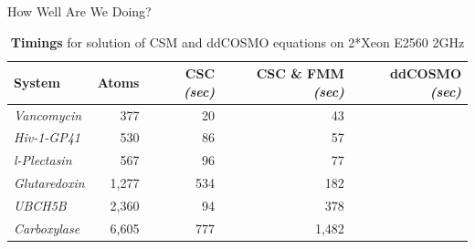 \begin{frame}{How Well Are We Doing?}
{\vfill



{\footnotesize
\begin{center}
\begin{table}
	\begin{tabular}{ lrrrr  }
\toprule[0.1em] 
{\bf System}	& {\bf Atoms}	& {\bf CSC} {\sl(sec)} & {\bf CSC \& FMM} {\sl(sec)} & {\bf ddCOSMO} {\sl(sec)} \\
\midrule[0.08em]
{\sl Vancomycin}	& 377	& 20  	& 43 		&  \phantom{$<\,$1} \\
{\sl Hiv-1-GP41} 	& 530	& 86		& 57 		& \\
{\sl l-Plectasin} 		& 567	& 96		& 77		&  \\
{\sl Glutaredoxin} 	& 1,277 	& 534 	& 182 	& \\
{\sl UBCH5B}		& 2,360 	& 94		& 378 	& \\
{\sl Carboxylase} 	& 6,605	& 777 	& 1,482	& \\
\bottomrule[0.1em]
	\end{tabular}
		\caption{\scriptsize {\bf Timings} for solution of CSM and ddCOSMO equations on 2*Xeon E2560 2GHz}
		\end{table}
\end{center}
}

}


\end{frame}
